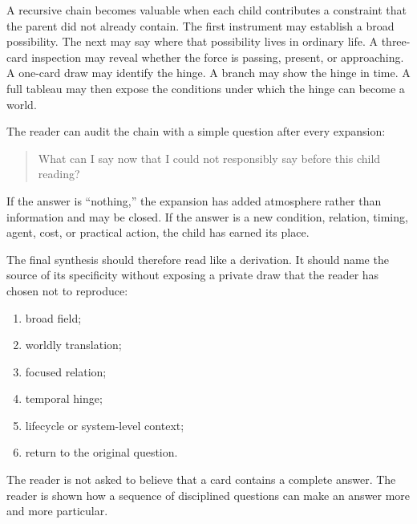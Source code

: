 A recursive chain becomes valuable when each child contributes a constraint that
the parent did not already contain. The first instrument may establish a broad
possibility. The next may say where that possibility lives in ordinary life. A
three-card inspection may reveal whether the force is passing, present, or
approaching. A one-card draw may identify the hinge. A branch may show the hinge
in time. A full tableau may then expose the conditions under which the hinge can
become a world.

The reader can audit the chain with a simple question after every expansion:

\begin{quote}
What can I say now that I could not responsibly say before this child reading?
\end{quote}

If the answer is ``nothing,'' the expansion has added atmosphere rather than
information and may be closed. If the answer is a new condition, relation,
timing, agent, cost, or practical action, the child has earned its place.

The final synthesis should therefore read like a derivation. It should name the
source of its specificity without exposing a private draw that the reader has
chosen not to reproduce:

\begin{enumerate}
\item broad field;
\item worldly translation;
\item focused relation;
\item temporal hinge;
\item lifecycle or system-level context;
\item return to the original question.
\end{enumerate}

The reader is not asked to believe that a card contains a complete answer. The
reader is shown how a sequence of disciplined questions can make an answer more
and more particular.
